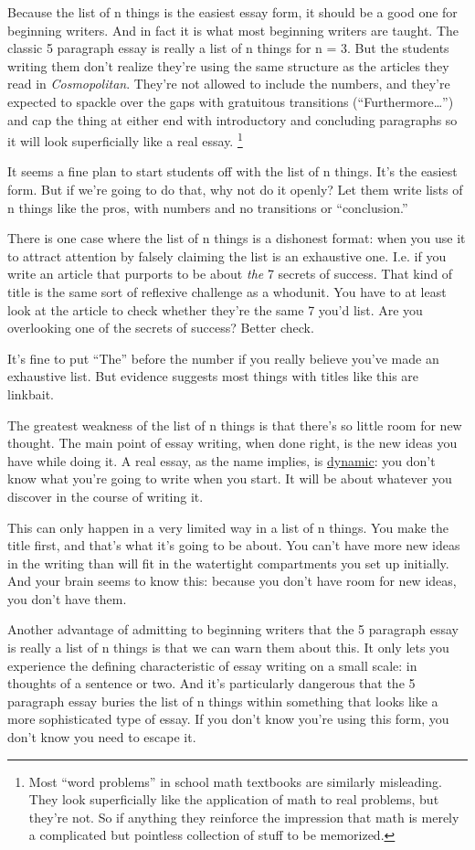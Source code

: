 Because the list of n things is the easiest essay form, it should be a
good one for beginning writers. And in fact it is what most beginning
writers are taught. The classic 5 paragraph essay is really a list of n
things for n = 3. But the students writing them don't realize they're
using the same structure as the articles they read in
\emph{Cosmopolitan}. They're not allowed to include the numbers, and
they're expected to spackle over the gaps with gratuitous transitions
(``Furthermore\ldots{}'') and cap the thing at either end with
introductory and concluding paragraphs so it will look superficially
like a real essay. \footnote{Most ``word problems'' in school math textbooks are similarly
misleading. They look superficially like the application of math to real
problems, but they're not. So if anything they reinforce the impression
that math is merely a complicated but pointless collection of stuff to
be memorized.}

It seems a fine plan to start students off with the list of n things.
It's the easiest form. But if we're going to do that, why not do it
openly? Let them write lists of n things like the pros, with numbers and
no transitions or ``conclusion.''

There is one case where the list of n things is a dishonest format: when
you use it to attract attention by falsely claiming the list is an
exhaustive one. I.e. if you write an article that purports to be about
\emph{the} 7 secrets of success. That kind of title is the same sort of
reflexive challenge as a whodunit. You have to at least look at the
article to check whether they're the same 7 you'd list. Are you
overlooking one of the secrets of success? Better check.

It's fine to put ``The'' before the number if you really believe you've
made an exhaustive list. But evidence suggests most things with titles
like this are linkbait.

The greatest weakness of the list of n things is that there's so little
room for new thought. The main point of essay writing, when done right,
is the new ideas you have while doing it. A real essay, as the name
implies, is \href{essay.html}{dynamic}: you don't know what you're going
to write when you start. It will be about whatever you discover in the
course of writing it.

This can only happen in a very limited way in a list of n things. You
make the title first, and that's what it's going to be about. You can't
have more new ideas in the writing than will fit in the watertight
compartments you set up initially. And your brain seems to know this:
because you don't have room for new ideas, you don't have them.

Another advantage of admitting to beginning writers that the 5 paragraph
essay is really a list of n things is that we can warn them about this.
It only lets you experience the defining characteristic of essay writing
on a small scale: in thoughts of a sentence or two. And it's
particularly dangerous that the 5 paragraph essay buries the list of n
things within something that looks like a more sophisticated type of
essay. If you don't know you're using this form, you don't know you need
to escape it.